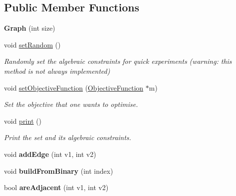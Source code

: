 \subsection*{Public Member Functions}
\begin{DoxyCompactItemize}
\item 
\hypertarget{classGraph_a7e963f57fa2c368e79db1562112aed54}{{\bfseries Graph} (int size)}\label{classGraph_a7e963f57fa2c368e79db1562112aed54}

\item 
\hypertarget{classGraph_ae2f806a5d1fd576be15019f5386cc2e9}{void \hyperlink{classGraph_ae2f806a5d1fd576be15019f5386cc2e9}{set\-Random} ()}\label{classGraph_ae2f806a5d1fd576be15019f5386cc2e9}

\begin{DoxyCompactList}\small\item\em Randomly set the algebraic constraints for quick experiments (warning\-: this method is not always implemented) \end{DoxyCompactList}\item 
void \hyperlink{classGraph_a294aff8b11a1b11dae2b4cd39b78b91d}{set\-Objective\-Function} (\hyperlink{classObjectiveFunction}{Objective\-Function} $\ast$m)
\begin{DoxyCompactList}\small\item\em Set the objective that one wants to optimise. \end{DoxyCompactList}\item 
\hypertarget{classGraph_a2ecf3dd3c4897aa924da8e5c221a8509}{void \hyperlink{classGraph_a2ecf3dd3c4897aa924da8e5c221a8509}{print} ()}\label{classGraph_a2ecf3dd3c4897aa924da8e5c221a8509}

\begin{DoxyCompactList}\small\item\em Print the set and its algebraic constraints. \end{DoxyCompactList}\item 
\hypertarget{classGraph_a97b56f6ca766306c46778aab649acb93}{void {\bfseries add\-Edge} (int v1, int v2)}\label{classGraph_a97b56f6ca766306c46778aab649acb93}

\item 
\hypertarget{classGraph_aa68cd04b69f30175237dc951c14ed5ab}{void {\bfseries build\-From\-Binary} (int index)}\label{classGraph_aa68cd04b69f30175237dc951c14ed5ab}

\item 
\hypertarget{classGraph_a82a6e60e8156ce5920ab100301888df4}{bool {\bfseries are\-Adjacent} (int v1, int v2)}\label{classGraph_a82a6e60e8156ce5920ab100301888df4}


\end{DoxyCompactItemize}
